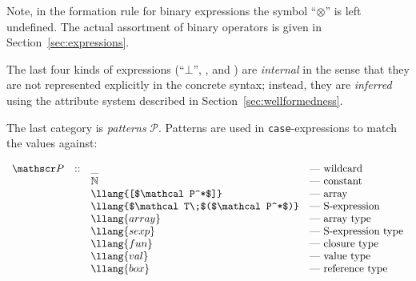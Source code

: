 Note, in the formation rule for binary expressions the symbol ``$\otimes$'' is left undefined. The actual assortment of
binary operators is given in Section~\ref{sec:expressions}.

The last four kinds of expressions (``$\bot$'', ,  and ) are \emph{internal} in the sense that
they are not represented  explicitly in the concrete syntax; instead, they are \emph{inferred} using the attribute system described
in Section~\ref{sec:wellformedness}. 

The last category is \emph{patterns} $\mathscr P$. Patterns are used in \lstinline|case|-expressions to match the values against:

\[
\begin{array}{rcll}
  \mathscr P & :: & \_                                     & \mbox{--- wildcard} \\
             &    & \mathbb N                              & \mbox{--- constant} \\
             &    & \llang{[$\mathcal P^*$]}               & \mbox{--- array}\\
             &    & \llang{$\mathcal T\;$($\mathcal P^*$)} & \mbox{--- S-expression}\\
             &    & \llang{array}                          & \mbox{--- array type}\\
             &    & \llang{sexp}                           & \mbox{--- S-expression type}\\
             &    & \llang{fun}                            & \mbox{--- closure type}\\  
             &    & \llang{val}                            & \mbox{--- value type}\\             
             &    & \llang{box}                            & \mbox{--- reference type}
\end{array}
\]

